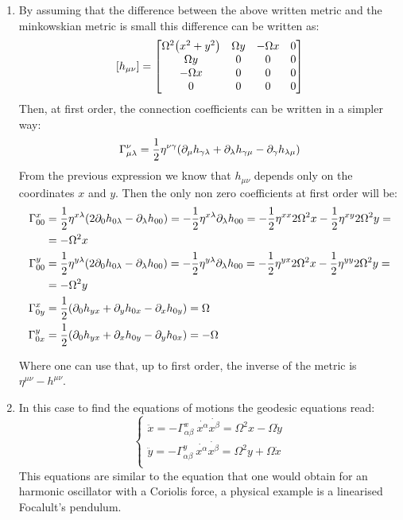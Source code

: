 \documentclass[11pt, oneside]{article}
\newcommand{\G}{\Gamma}
\begin{document}
\begin{enumerate}
\item By assuming that the difference between the above written metric and the minkowskian metric is small this difference can be written as:
\[
	\qty[h_{\mu\nu}] = 
	\begin{bmatrix}
		\Omega^2\qty(x^2 + y^2)& \Omega y & -\Omega x & 0 \\
		\Omega y & 0 & 0 & 0 \\
		-\Omega x & 0 & 0 & 0 \\
		0 & 0 & 0 & 0 \\
	\end{bmatrix}
\]
Then, at first order, the connection coefficients can be written in a simpler way:
\[
	\G_{\mu\lambda}^\nu = \frac{1}{2} \eta^{\nu\gamma}\qty(\partial_\mu h_{\gamma\lambda} + \partial_{\lambda}h_{\gamma\mu} - \partial_\gamma h_{\lambda\mu} )
\]
From the previous expression we know that $h_{\mu\nu}$ depends only on the coordinates $x$ and $y$. Then the only non zero coefficients at first order will be:
\begin{align*}
	\G^{x}_{00} &= \frac{1}{2} \eta^{x\lambda} \qty(2\partial_0 h_{0\lambda} - \partial_\lambda h_{00}) = -\frac{1}{2} \eta^{x\lambda} \partial_\lambda h_{00} = -\frac{1}{2} \eta^{xx} 2\Omega^2 x -\frac{1}{2} \eta^{xy} 2\Omega^2 y = \\
	&= -\Omega^2 x \\
	\G^{y}_{00} &= \frac{1}{2} \eta^{y\lambda} \qty(2\partial_0 h_{0\lambda} - \partial_\lambda h_{00}) = -\frac{1}{2} \eta^{y\lambda} \partial_\lambda h_{00} = -\frac{1}{2} \eta^{yx} 2\Omega^2 x -\frac{1}{2} \eta^{yy} 2\Omega^2 y =  \\
	&= -\Omega^2 y \\
	\G^{x}_{0y} &= \frac{1}{2} \qty(\partial_0 h_{yx} + \partial_y h _{0x} - \partial_x h_{0y}) = \Omega \\
	\G^{y}_{0x} &= \frac{1}{2} \qty(\partial_0 h_{yx} + \partial_x h _{0y} - \partial_y h_{0x}) = -\Omega 
\end{align*}

Where one can use that, up to first order, the inverse of the metric is $\eta^{\mu\nu} - h^{\mu\nu}$.

\item In this case to find the equations of motions the geodesic equations read:
\[
	\begin{cases}
		\ddot{x} = -\G^{x}_{\alpha\beta} \:\dot{x^\alpha} \dot{x^\beta} = \Omega^2 x - \Omega \dot{y} \\
		\ddot{y} = -\G^{y}_{\alpha\beta} \:\dot{x^\alpha} \dot{x^\beta} = \Omega^2 y + \Omega \dot{x} \\
	\end{cases}
\]
This equations are similar to the equation that one would obtain for an harmonic oscillator with a Coriolis force, a physical example is a linearised Focalult's pendulum.
\end{enumerate}
\end{document}
